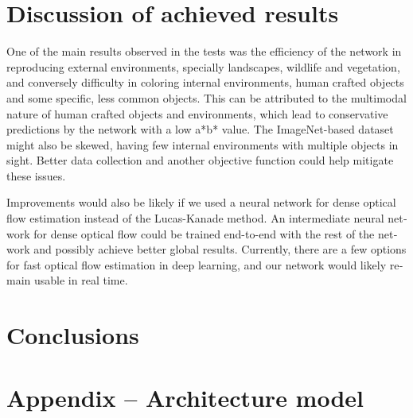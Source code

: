 \documentclass[12pt,openright,oneside,a4paper,english]{abntex2}
\begin{document}
\begin{otherlanguage}{english}
\chapter{Discussion of achieved results}
One of the main results observed in the tests was the efficiency of the network in reproducing external environments, specially landscapes, wildlife and vegetation, and conversely difficulty in coloring internal environments, human crafted objects and some specific, less common objects. This can be attributed to the multimodal nature of human crafted objects and environments, which lead to conservative predictions by the network with a low a*b* value.  The ImageNet-based dataset might also be skewed, having few internal environments with multiple objects in sight. Better data collection and another objective function could help mitigate these issues.

Improvements would also be likely if we used a neural network for dense optical flow estimation instead of the Lucas-Kanade method. An intermediate neural network for dense optical flow could be trained end-to-end with the rest of the network and possibly achieve better global results. Currently, there are a few options for fast optical flow estimation in deep learning, and our network would likely remain usable in real time.




\chapter{Conclusions}


\appendix
\chapter{Appendix -- Architecture model}


\end{otherlanguage}
\end{document}
